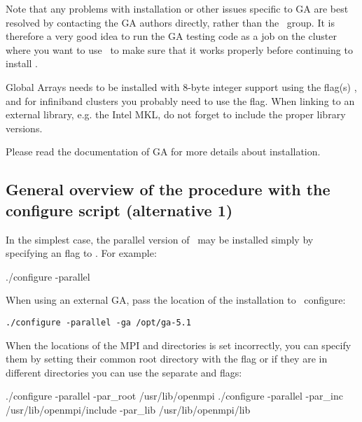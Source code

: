 
Note that any problems with installation or other issues specific to GA are
best resolved by contacting the GA authors directly, rather than the
\molcas\ group.  It is therefore a very good idea to run the GA
testing code as a job on the cluster where you want to use \molcas\ to make sure
that it works properly before continuing to install \molcas.

Global Arrays needs to be installed with 8-byte integer support using
the flag(s) ,
and for infiniband clusters you probably need to use the  flag.
When linking to an external library, e.g. the Intel MKL, do not forget to include
the proper  library versions.

Please read the documentation of GA for more details about installation.

\subsection{General overview of the procedure with the configure script (alternative 1)}

In the simplest case, the parallel version of \molcas\ may be installed
simply by specifying an flag 
to . For example:
\begin{sourcelisting}
./configure -parallel 
\end{sourcelisting}

When using an external GA, pass the location of the installation to \molcas\ configure:
\begin{verbatim}
./configure -parallel -ga /opt/ga-5.1
\end{verbatim}

When the locations of the MPI  and  directories is set
incorrectly, you can specify them by setting their common root directory with
the  flag or if they are in different directories you can use the
separate  and  flags:
\begin{sourcelisting}
./configure -parallel -par_root /usr/lib/openmpi
./configure -parallel -par_inc /usr/lib/openmpi/include -par_lib /usr/lib/openmpi/lib
\end{sourcelisting}

